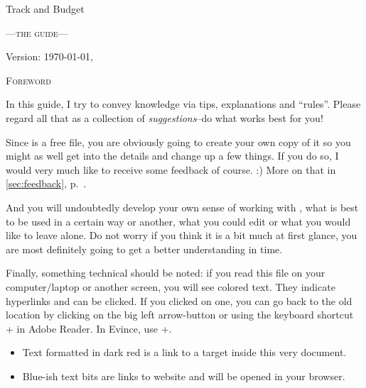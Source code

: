 
\begin{center}\LARGE
Track and Budget
\end{center}
\begin{center}\scshape\large\sffamily
	---the guide---
\end{center}

\vfill
\begin{center}
Version: \today, \thistime
\end{center}

\clearpage
\begin{center}\large\scshape
	Foreword
\end{center}
In this guide, I try to convey knowledge via tips, explanations and ``rules''.
Please regard all that as a collection of \emph{suggestions}--do what works best for you!

Since \tfn is a free file, you are obviously going to create your own copy of it so you might as well get into the details and change up a few things.
If you do so, I would very much like to receive some feedback of course. :)
More on that in \autoref{sec:feedback}, p.~\pageref{sec:feedback}.

And you will undoubtedly develop your own sense of working with \tfn, what is best to be used in a certain way or another, what you could edit or what you would like to leave alone.
Do not worry if you think it is a bit much at first glance, you are most definitely going to get a better understanding in time.

Finally, something technical should be noted: if you read this file on your computer/laptop or another screen, you will see colored text.
They indicate hyperlinks and can be clicked.
If you clicked on one, you can go back to the old location by clicking on the big left arrow-button or using the keyboard shortcut +\keystroke{\( \leftarrow \)}  in Adobe Reader.
In Evince, use +.
\begin{itemize}
	\item Text formatted in dark red is a link to a target inside this very document.
	\item Blue-ish text bits are links to website and will be opened in your browser.
\end{itemize}
